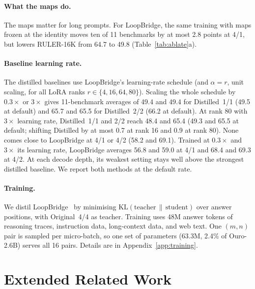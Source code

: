 \documentclass[11pt]{article}
\begin{document}
\paragraph{What the maps do.} The maps matter for long prompts. For LoopBridge, the same training with maps frozen at the
identity moves ten of 11 benchmarks by at most 2.8 points at 4/1, but lowers RULER-16K from 64.7 to 49.8
(Table~\ref{tab:ablate}a).

\paragraph{Baseline learning rate.} The distilled baselines use LoopBridge's learning-rate schedule (and $\alpha=r$, unit
scaling, for all LoRA ranks $r\in\{4,16,64,80\}$). Scaling the whole schedule by $0.3\times$ or $3\times$ gives
11-benchmark averages of 49.4 and 49.4 for Distilled~1/1 (49.5 at default) and 65.7 and 65.5 for Distilled~2/2 (66.2 at
default). At rank 80 with $3\times$ learning rate, Distilled~1/1 and 2/2 reach 48.4 and 65.4 (49.3 and 65.5 at default;
shifting Distilled by at most 0.7 at rank 16 and 0.9 at rank 80). None comes close to LoopBridge at 4/1 or 4/2 (58.2 and
69.1). Trained at $0.3\times$ and $3\times$ its learning rate, LoopBridge averages 56.8 and 59.0 at 4/1 and 68.4 and 69.3
at 4/2. At each decode depth, its weakest setting stays well above the strongest distilled baseline. We report both
methods at the default rate.

\paragraph{Training.} We distil LoopBridge~\citep{kd} by minimising $\mathrm{KL}(\text{teacher}\,\|\,\text{student})$
over answer positions, with Original~4/4 as teacher. Training uses 48M answer tokens of reasoning traces, instruction
data, long-context data, and web text. One $(m,n)$ pair is sampled per micro-batch, so one set of parameters (63.3M,
2.4\% of Ouro-2.6B) serves all 16 pairs. Details are in Appendix~\ref{app:training}.


\section{Extended Related Work}
\label{app:related}
\end{document}
